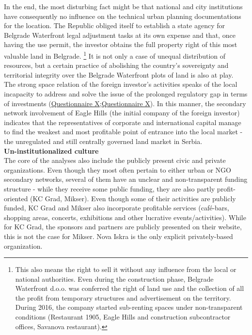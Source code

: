 \documentclass[11pt]{report}
\begin{document}
{{{{In the end, the most disturbing fact might be that national and city institutions have consequently no influence on the technical urban planning documentations for the location. The Republic obliged itself to establish a state agency for Belgrade Waterfront legal adjustment tasks at its own expense and that, once having the use permit, the investor obtains the full property right of this most valuable land in Belgrade. 
\footnote{This also means the right to sell it without any influence from the local or national authorities. Even during the construction phase, Belgrade Waterfront d.o.o. was conferred the right of land use and the collection of all the profit from temporary structures and advertisement on the territory. During 2016, the company started sub-renting spaces under non-transparent conditions (Restaurant 1905, Eagle Hills and construction subcontractor offices, Savanova restaurant).}
It is not only a case of unequal distribution of resources, but a certain practice of abolishing the country’s sovereignty and territorial integrity over the Belgrade Waterfront plots of land is also at play.
\\

The strong space relation of the foreign investor's activities speaks of the local incapacity to address and solve the issue of the prolonged regulatory gap in terms of investments (\href{Questionnaire Experts Post-socialist}{Questionnaire X};\href{Questionnaire Experts Savamala}{Questionnaire X}).
In this manner, the secondary network involvement of Eagle Hills (the initial company of the foreign investor) indicates that the representatives of corporate and international capital manage to find the weakest and most profitable point of entrance into the local market - the unregulated and still centrally governed land market in Serbia.
\\

\textbf{Un-institutionalized culture}
\\

The core of the analyses also include the publicly present civic and private organizations.  Even though  they most often pertain to either  urban or NGO secondary networks, several of them have an unclear and non-transparent funding structure - while they receive some public funding, they are also partly profit-oriented (KC Grad, Mikser). Even though some of their activities are publicly funded, KC Grad and Mikser also incorporate profitable services (café-bars, shopping areas, concerts, exhibitions and other lucrative events/activities). While for KC Grad, the sponsors and partners are  publicly presented on their website, this is not the case for Mikser. Nova Iskra is the only explicit privately-based organization.
\\

}}}}
\end{document}
